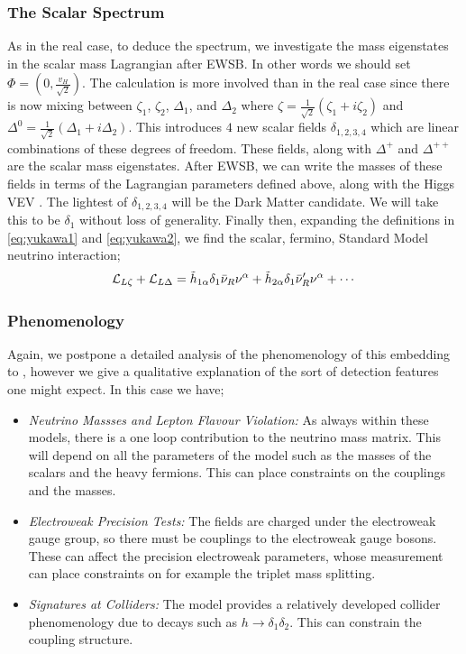 \documentclass[10pt]{article}
\begin{document}
\subsubsection{The Scalar Spectrum}
As in the real case, to deduce the spectrum, we investigate the mass eigenstates in the scalar mass Lagrangian after EWSB. In other words we should set $\Phi = (0, \tfrac{v_H}{\sqrt{2}})$. The calculation is more involved than in the real case \cite{Farzan2011, Farzan2010a} since there is now mixing between $\zeta_1$, $\zeta_2$, $\Delta_1$, and $\Delta_2$ where $\zeta = \tfrac{1}{\sqrt{2}}(\zeta_1 + i \zeta_2)$ and $\Delta^0 = \tfrac{1}{\sqrt{2}}(\Delta_1 + i\Delta_2)$. This introduces $4$ new scalar fields $\delta_{1,2,3,4}$ which are linear combinations of these degrees of freedom. These fields, along with $\Delta^+$ and $\Delta^{++}$ are the scalar mass eigenstates. After EWSB, we can write the masses of these fields in terms of the Lagrangian parameters defined above, along with the Higgs VEV \cite{Farzan2010a}. The lightest of $\delta_{1,2,3,4}$ will be the Dark Matter candidate. We will take this to be $\delta_1$ without loss of generality. Finally then, expanding the definitions in \eqref{eq:yukawa1} and \eqref{eq:yukawa2}, we find the scalar, fermino, Standard Model neutrino interaction;
\begin{equation}
  \mathcal{L}_{L\zeta} + \mathcal{L}_{L\Delta} = \tilde{h}_{1\alpha} \delta_1 \bar{\nu}_R \nu^\alpha + \tilde{h}_{2\alpha}\delta_1 \bar{\nu}^\prime_R \nu^\alpha + \cdots
\end{equation}
\subsubsection{Phenomenology}
Again, we postpone a detailed analysis of the phenomenology of this embedding to \cite{Farzan2011}, however we give a qualitative explanation of the sort of detection features one might expect. In this case we have;
\begin{itemize}
  \item \textit{Neutrino Massses and Lepton Flavour Violation:} As always within these models, there is a one loop contribution to the neutrino mass matrix. This will depend on all the parameters of the model such as the masses of the scalars and the heavy fermions. This can place constraints on the couplings and the masses.
  \item \textit{Electroweak Precision Tests:} The fields are charged under the electroweak gauge group, so there must be couplings to the electroweak gauge bosons. These can affect the precision electroweak parameters, whose measurement can place constraints on for example the triplet mass splitting.
  \item \textit{Signatures at Colliders:} The model provides a relatively developed collider phenomenology due to decays such as $h \rightarrow \delta_1\delta_2$. This can constrain the coupling structure.
\end{itemize}
\end{document}
